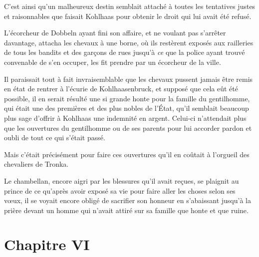 \documentclass[french,twoside]{book} %
\newcommand\chapteropen{} %
\newcommand\chapterclose{} %
\begin{document}
C’est ainsi qu’un malheureux destin semblait attaché à toutes les tentatives justes et raisonnables que faisait Kohlhaas pour obtenir le droit qui lui avait été refusé.\par
L’écorcheur de Dobbeln ayant fini son affaire, et ne voulant pas s’arrêter davantage, attacha les chevaux à une borne, où ils restèrent exposés aux railleries de tous les bandits et des garçons de rues jusqu’à \emph{ce} que la police ayant trouvé convenable de s’en occuper, les fit prendre par un écorcheur de la ville.\par
Il paraissait tout à fait invraisemblable que les chevaux pussent jamais être remis en état de rentrer à l’écurie de Kohlhaasenbruck, et supposé que cela eût été possible, il en serait résulté une si grande honte pour la famille du gentilhomme, qui était une des premières et des plus nobles de l’État, qu’il semblait beaucoup plus sage d’offrir à Kohlhaas une indemnité en argent. Celui-ci n’attendait plus que les ouvertures du gentilhomme ou de ses parents pour lui accorder pardon et oubli de tout ce qui s’était passé.\par
Mais c’était précisément pour faire ces ouvertures qu’il en coûtait à l’orgueil des chevaliers de Tronka.\par
Le chambellan, encore aigri par les blessures qu’il avait reçues, se plaignit au prince de ce qu’après avoir exposé sa vie pour faire aller les choses selon ses vœux, il se voyait encore obligé de sacrifier son honneur en s’abaissant jusqu’à la prière devant un homme qui n’avait attiré sur sa famille que honte et que ruine.
\chapterclose


\chapteropen
\chapter[Chapitre VI]{Chapitre VI}\renewcommand{\leftmark}{Chapitre VI}
\end{document}
